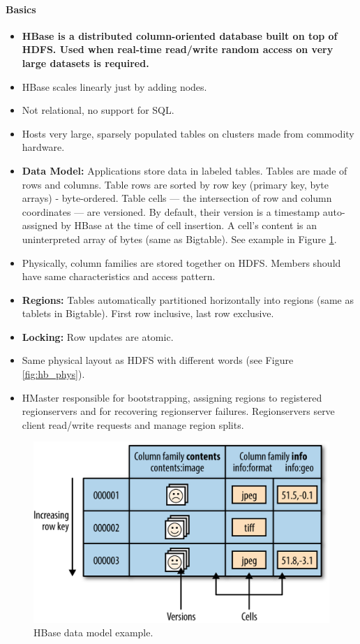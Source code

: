 \paragraph{Basics}
\begin{itemize}
    \item \textbf{HBase is a distributed column-oriented database built on top of HDFS. Used when real-time read/write random access on very large datasets is required.}
    \item HBase scales linearly just by adding nodes.
    \item Not relational, no support for SQL.
    \item Hosts very large, sparsely populated tables on clusters made from commodity hardware.
    \item \textbf{Data Model:} Applications store data in labeled tables. Tables are made of rows and columns. Table rows are sorted by row key (primary key, byte arrays) - byte-ordered. Table cells — the intersection of row and column coordinates — are versioned. By default, their version is a timestamp auto-assigned by HBase at the time of cell insertion. A cell’s content is an uninterpreted array of bytes (same as Bigtable). See example in Figure \ref{fig:hb_ex}.
    \item Physically, column families are stored together on HDFS. Members should have same characteristics and access pattern.
    \item \textbf{Regions:} Tables automatically partitioned horizontally into regions (same as tablets in Bigtable). First row inclusive, last row exclusive.
    \item \textbf{Locking:} Row updates are atomic.
    \item Same physical layout as HDFS with different words (see Figure \ref{fig:hb_phys}).
    \item HMaster responsible for bootstrapping, assigning regions to registered regionservers and for recovering regionserver failures. Regionservers serve client read/write requests and manage region splits.
\end{itemize}


\begin{figure}[h]
	\centering
	\includegraphics[scale=0.3]{images/3-hbase.png}
	\caption{HBase data model example.}
	\label{fig:hb_ex}
\end{figure}

